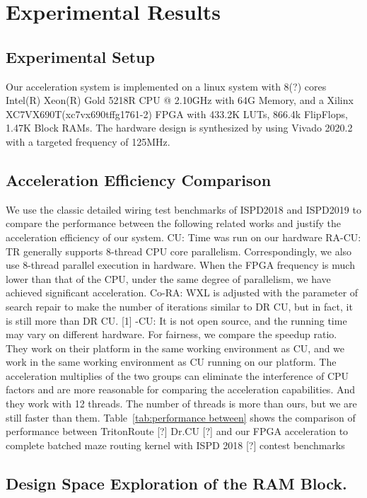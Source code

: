 \documentclass[conference]{IEEEtran}
\begin{document}
\section{Experimental Results}\label{sec:experiment}
\subsection{Experimental Setup}
Our  acceleration system is implemented on a linux system with 8(?) cores Intel(R) Xeon(R) Gold 5218R CPU @ 2.10GHz with 64G Memory, and a Xilinx XC7VX690T(xc7vx690tffg1761-2) FPGA with 433.2K LUTs, 866.4k FlipFlops, 1.47K Block RAMs.
The hardware design is synthesized by using Vivado 2020.2 with a targeted frequency of 125MHz.

\subsection{Acceleration Efficiency Comparison}
We use the classic detailed wiring test benchmarks of ISPD2018 and ISPD2019 to compare the performance between the following related works and justify the acceleration efficiency of our system.
CU: Time was run on our hardware
RA-CU: TR generally supports 8-thread CPU core parallelism. Correspondingly, we also use 8-thread parallel execution in hardware. When the FPGA frequency is much lower than that of the CPU, under the same degree of parallelism, we have achieved significant acceleration.
Co-RA: WXL is adjusted with the parameter of search repair to make the number of iterations similar to DR CU, but in fact, it is still more than DR CU.
[1] -CU: It is not open source, and the running time may vary on different hardware. For fairness, we compare the speedup ratio. They work on their platform in the same working environment as CU, and we work in the same working environment as CU running on our platform.
The acceleration multiplies of the two groups can eliminate the interference of CPU factors and are more reasonable for comparing the acceleration capabilities.
And they work with 12 threads. The number of threads is more than ours, but we are still faster than them.
Table~\ref{tab:performance between} shows the comparison of performance between TritonRoute [?] Dr.CU [?] and our FPGA acceleration to complete batched maze routing kernel with ISPD 2018 [?] contest benchmarks

\subsection{Design Space Exploration of the RAM Block.}
\end{document}
